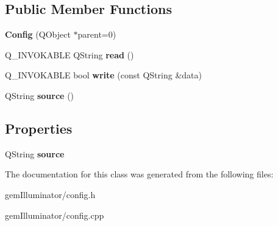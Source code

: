 \subsection*{Public Member Functions}
\begin{DoxyCompactItemize}
\item 
\hypertarget{class_config_ad534404fa0c9fffe81d6859d88b527be}{}{\bfseries Config} (Q\+Object $\ast$parent=0)\label{class_config_ad534404fa0c9fffe81d6859d88b527be}

\item 
\hypertarget{class_config_a39a9b9a0d8e01451e39b2e6db69d2b07}{}Q\+\_\+\+I\+N\+V\+O\+K\+A\+B\+L\+E Q\+String {\bfseries read} ()\label{class_config_a39a9b9a0d8e01451e39b2e6db69d2b07}

\item 
\hypertarget{class_config_a684d7acdbe8a5d564f01812f7d0fe775}{}Q\+\_\+\+I\+N\+V\+O\+K\+A\+B\+L\+E bool {\bfseries write} (const Q\+String \&data)\label{class_config_a684d7acdbe8a5d564f01812f7d0fe775}

\item 
\hypertarget{class_config_a4c57268899313893ce95857cdec5c1a3}{}Q\+String {\bfseries source} ()\label{class_config_a4c57268899313893ce95857cdec5c1a3}

\end{DoxyCompactItemize}
\subsection*{Properties}
\begin{DoxyCompactItemize}
\item 
\hypertarget{class_config_a1d0aeaacc2f358bb5a448f314c819d66}{}Q\+String {\bfseries source}\label{class_config_a1d0aeaacc2f358bb5a448f314c819d66}

\end{DoxyCompactItemize}


The documentation for this class was generated from the following files\+:\begin{DoxyCompactItemize}
\item 
gem\+Illuminator/config.\+h\item 
gem\+Illuminator/config.\+cpp\end{DoxyCompactItemize}
